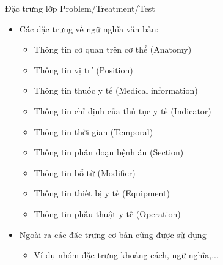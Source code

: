 \begin{frame}{Đặc trưng lớp Problem/Treatment/Test}
\begin{itemize}
	\item Các đặc trưng về ngữ nghĩa văn bản:
	\begin{itemize}
		\item Thông tin cơ quan trên cơ thể (Anatomy)
		\item Thông tin vị trí (Position)
		\item Thông tin thuốc y tế (Medical information)
		\item Thông tin chỉ định của thủ tục y tế (Indicator)
		\item Thông tin thời gian (Temporal)
		\item Thông tin phân đoạn bệnh án (Section)
		\item Thông tin bổ từ (Modifier)
		\item Thông tin thiết bị y tế (Equipment)
		\item Thông tin phẫu thuật y tế (Operation)
	\end{itemize}
	\item Ngoài ra các đặc trưng cơ bản cũng được sử dụng
	\begin{itemize}
		\item Ví dụ nhóm đặc trưng khoảng cách, ngữ nghĩa,...
	\end{itemize}
\end{itemize}
\end{frame}